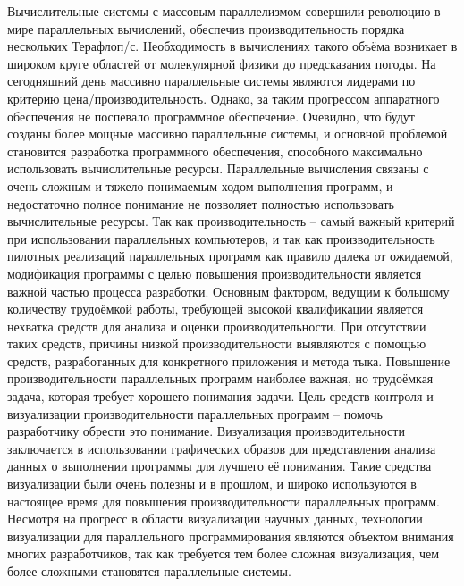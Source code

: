 \Introduction

Вычислительные системы с массовым параллелизмом совершили революцию в мире параллельных вычислений, обеспечив производительность порядка нескольких Терафлоп/с. Необходимость в вычислениях такого объёма возникает в широком круге областей от молекулярной физики до предсказания погоды. На сегодняшний день массивно параллельные системы являются лидерами по критерию цена/производительность.
Однако, за таким прогрессом аппаратного обеспечения не поспевало программное обеспечение. Очевидно, что будут созданы более мощные массивно параллельные системы, и основной проблемой становится разработка программного обеспечения, способного максимально использовать вычислительные ресурсы. Параллельные вычисления связаны с очень сложным и тяжело понимаемым ходом выполнения программ, и недостаточно полное понимание не позволяет полностью использовать вычислительные ресурсы.
Так как производительность – самый важный критерий при использовании параллельных компьютеров, и так как производительность пилотных реализаций параллельных программ как правило далека от ожидаемой, модификация программы с целью повышения производительности является важной частью процесса разработки. Основным фактором, ведущим к большому количеству трудоёмкой работы, требующей высокой квалификации является нехватка средств для анализа и оценки производительности. При отсутствии таких средств, причины низкой производительности выявляются с помощью средств, разработанных для конкретного приложения и метода тыка. Повышение производительности параллельных программ наиболее важная, но трудоёмкая задача, которая требует хорошего понимания задачи. Цель средств контроля и визуализации производительности параллельных программ – помочь разработчику обрести это понимание.
Визуализация производительности заключается в использовании графических образов для представления анализа данных о выполнении программы для лучшего её понимания. Такие средства визуализации были очень полезны и в прошлом, и широко используются в настоящее время для повышения производительности параллельных программ. Несмотря на прогресс в области визуализации научных данных, технологии визуализации для параллельного программирования являются объектом внимания многих разработчиков, так как требуется тем более сложная визуализация, чем более сложными становятся параллельные системы.
